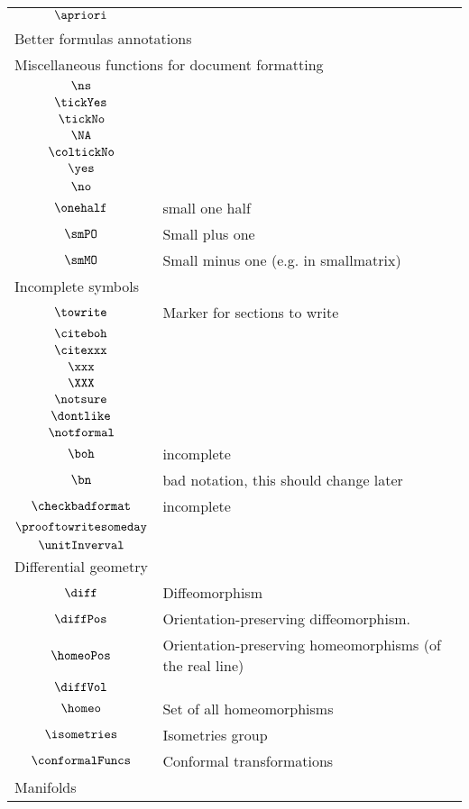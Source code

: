 \begin{longtable}{cl}
 $\apriori$ & \\ 
 \multicolumn{2}{l}{Better formulas annotations}\\ 
 \hline
\multicolumn{2}{l}{Miscellaneous functions for document formatting}\\ 
 \hline
$\ns$ & \\ 
 $\tickYes$ & \\ 
 $\tickNo$ & \\ 
 $\NA$ & \\ 
 $\coltickNo$ & \\ 
 $\yes$ & \\ 
 $\no$ & \\ 
 $\onehalf$ &  small one half\\ 
 $\smPO$ &  Small plus one \\ 
 $\smMO$ &  Small minus one (e.g. in smallmatrix)\\ 
 \multicolumn{2}{l}{Incomplete symbols}\\ 
 \hline
$\towrite$ &  Marker for sections to write\\ 
 $\citeboh$ & \\ 
 $\citexxx$ & \\ 
 $\xxx$ & \\ 
 $\XXX$ & \\ 
 $\notsure$ & \\ 
 $\dontlike$ & \\ 
 $\notformal$ & \\ 
 $\boh$ &  incomplete\\ 
 $\bn$ &  bad notation, this should change later\\ 
 $\checkbadformat$ &  incomplete\\ 
 $\prooftowritesomeday$ & \\ 
 $\unitInverval$ & \\ 
 \multicolumn{2}{l}{Differential geometry}\\ 
 \hline
$\diff$ &  Diffeomorphism\\ 
 $\diffPos$ &  Orientation-preserving diffeomorphism.\\ 
 $\homeoPos$ &  Orientation-preserving homeomorphisms (of the real line)\\ 
 $\diffVol$ & \\ 
 $\homeo$ &  Set of all homeomorphisms\\ 
 $\isometries$ &  Isometries group\\ 
 $\conformalFuncs$ &  Conformal transformations\\ 
 \multicolumn{2}{l}{Manifolds}\\ 

\end{longtable}
